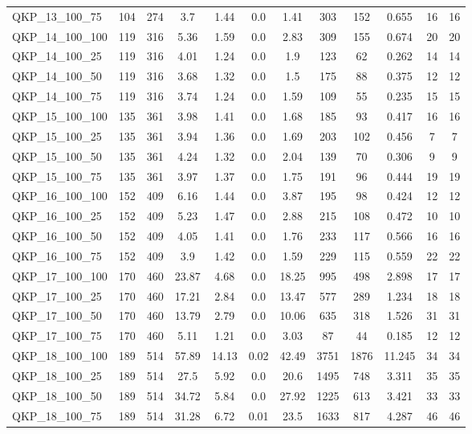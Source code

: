 \begin{table}[!h]
{\begin{tabular}{lccccccccccc}
QKP\_13\_100\_75 & 104 & 274 & 3.7 & 1.44 & 0.0 & 1.41 & 303 & 152 & 0.655 & 16 & 16\\
QKP\_14\_100\_100 & 119 & 316 & 5.36 & 1.59 & 0.0 & 2.83 & 309 & 155 & 0.674 & 20 & 20\\
QKP\_14\_100\_25 & 119 & 316 & 4.01 & 1.24 & 0.0 & 1.9 & 123 & 62 & 0.262 & 14 & 14\\
QKP\_14\_100\_50 & 119 & 316 & 3.68 & 1.32 & 0.0 & 1.5 & 175 & 88 & 0.375 & 12 & 12\\
QKP\_14\_100\_75 & 119 & 316 & 3.74 & 1.24 & 0.0 & 1.59 & 109 & 55 & 0.235 & 15 & 15\\
QKP\_15\_100\_100 & 135 & 361 & 3.98 & 1.41 & 0.0 & 1.68 & 185 & 93 & 0.417 & 16 & 16\\
QKP\_15\_100\_25 & 135 & 361 & 3.94 & 1.36 & 0.0 & 1.69 & 203 & 102 & 0.456 & 7 & 7\\
QKP\_15\_100\_50 & 135 & 361 & 4.24 & 1.32 & 0.0 & 2.04 & 139 & 70 & 0.306 & 9 & 9\\
QKP\_15\_100\_75 & 135 & 361 & 3.97 & 1.37 & 0.0 & 1.75 & 191 & 96 & 0.444 & 19 & 19\\
QKP\_16\_100\_100 & 152 & 409 & 6.16 & 1.44 & 0.0 & 3.87 & 195 & 98 & 0.424 & 12 & 12\\
QKP\_16\_100\_25 & 152 & 409 & 5.23 & 1.47 & 0.0 & 2.88 & 215 & 108 & 0.472 & 10 & 10\\
QKP\_16\_100\_50 & 152 & 409 & 4.05 & 1.41 & 0.0 & 1.76 & 233 & 117 & 0.566 & 16 & 16\\
QKP\_16\_100\_75 & 152 & 409 & 3.9 & 1.42 & 0.0 & 1.59 & 229 & 115 & 0.559 & 22 & 22\\
QKP\_17\_100\_100 & 170 & 460 & 23.87 & 4.68 & 0.0 & 18.25 & 995 & 498 & 2.898 & 17 & 17\\
QKP\_17\_100\_25 & 170 & 460 & 17.21 & 2.84 & 0.0 & 13.47 & 577 & 289 & 1.234 & 18 & 18\\
QKP\_17\_100\_50 & 170 & 460 & 13.79 & 2.79 & 0.0 & 10.06 & 635 & 318 & 1.526 & 31 & 31\\
QKP\_17\_100\_75 & 170 & 460 & 5.11 & 1.21 & 0.0 & 3.03 & 87 & 44 & 0.185 & 12 & 12\\
QKP\_18\_100\_100 & 189 & 514 & 57.89 & 14.13 & 0.02 & 42.49 & 3751 & 1876 & 11.245 & 34 & 34\\
QKP\_18\_100\_25 & 189 & 514 & 27.5 & 5.92 & 0.0 & 20.6 & 1495 & 748 & 3.311 & 35 & 35\\
QKP\_18\_100\_50 & 189 & 514 & 34.72 & 5.84 & 0.0 & 27.92 & 1225 & 613 & 3.421 & 33 & 33\\
QKP\_18\_100\_75 & 189 & 514 & 31.28 & 6.72 & 0.01 & 23.5 & 1633 & 817 & 4.287 & 46 & 46\\

\end{tabular}}
\end{table}
